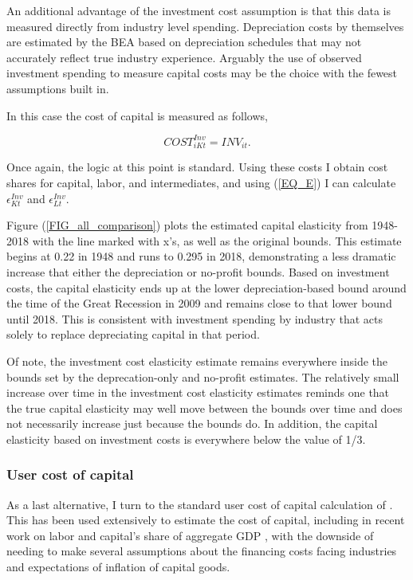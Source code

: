 \documentclass[11pt]{article}
\begin{document}
An additional advantage of the investment cost assumption is that this data is measured directly from industry level spending. Depreciation costs by themselves are estimated by the BEA based on depreciation schedules that may not accurately reflect true industry experience. Arguably the use of observed investment spending to measure capital costs may be the choice with the fewest assumptions built in.

In this case the cost of capital is measured as follows,

\begin{equation}
	COST^{Inv}_{iKt} = INV_{it}. 
\end{equation}

Once again, the logic at this point is standard. Using these costs I obtain cost shares for capital, labor, and intermediates, and using (\ref{EQ_E}) I can calculate $\epsilon_{Kt}^{Inv}$ and $\epsilon_{Lt}^{Inv}$. 

Figure (\ref{FIG_all_comparison}) plots the estimated capital elasticity from 1948-2018 with the line marked with x's, as well as the original bounds. This estimate begins at 0.22 in 1948 and runs to 0.295 in 2018, demonstrating a less dramatic increase that either the depreciation or no-profit bounds. Based on investment costs, the capital elasticity ends up at the lower depreciation-based bound around the time of the Great Recession in 2009 and remains close to that lower bound until 2018. This is consistent with investment spending by industry that acts solely to replace depreciating capital in that period.

Of note, the investment cost elasticity estimate remains everywhere inside the bounds set by the deprecation-only and no-profit estimates. The relatively small increase over time in the investment cost elasticity estimates reminds one that the true capital elasticity may well move between the bounds over time and does not necessarily increase just because the bounds do. In addition, the capital elasticity based on investment costs is everywhere below the value of 1/3.

\subsubsection{User cost of capital}
As a last alternative, I turn to the standard user cost of capital calculation of \cite{halljorg1967}. This has been used extensively to estimate the cost of capital, including in recent work on labor and capital's share of aggregate GDP \citep{Barkai000}, with the downside of needing to make several assumptions about the financing costs facing industries and expectations of inflation of capital goods. 
\end{document}
